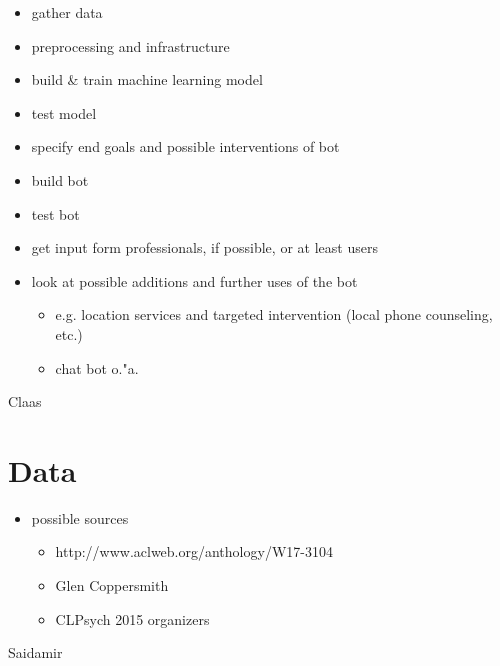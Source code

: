 \documentclass[colorback,accentcolor=tud9c]{tudreport}
\begin{document}
\begin{itemize}
    \item gather data
    \item preprocessing and infrastructure
    \item build \& train machine learning model
    \item test model
    \item specify end goals and possible interventions of bot
    \item build bot
    \item test bot
    \item get input form professionals, if possible, or at least users
    \item look at possible additions and further uses of the bot
    \begin{itemize}
        \item e.g. location services and targeted intervention (local phone counseling, etc.)
        \item chat bot o."a.
    \end{itemize}
\end{itemize}

Claas

\chapter{Data}
\begin{itemize}
    \item possible sources
    \begin{itemize}
        \item http://www.aclweb.org/anthology/W17-3104
    \item Glen Coppersmith
    \item CLPsych 2015 organizers
    \end{itemize}
\end{itemize}

Saidamir
\end{document}
